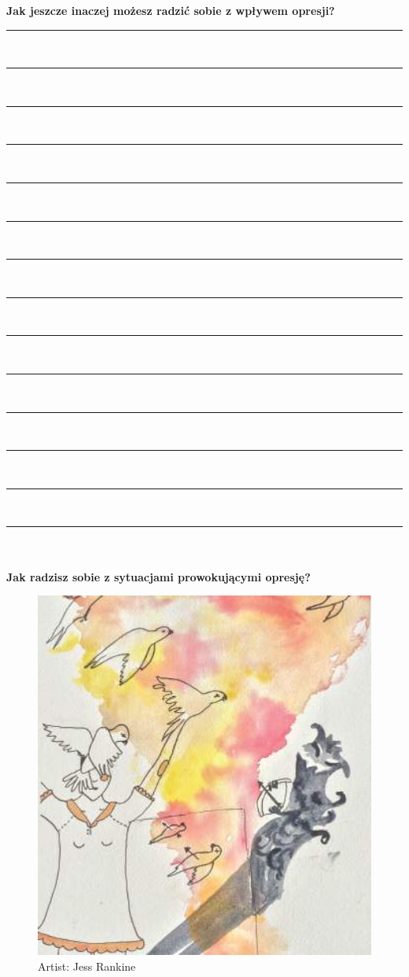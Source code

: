 \noindent\textcolor{ProcessBlue}{\textbf{\Large{Jak jeszcze inaczej możesz radzić sobie z wpływem opresji?}}}\\
\noindent\rule{\textwidth}{1pt}\\
\noindent\rule{\textwidth}{1pt}\\
\noindent\rule{\textwidth}{1pt}\\
\noindent\rule{\textwidth}{1pt}\\
\noindent\rule{\textwidth}{1pt}\\
\noindent\rule{\textwidth}{1pt}\\
\noindent\rule{\textwidth}{1pt}\\
\noindent\rule{\textwidth}{1pt}\\
\noindent\rule{\textwidth}{1pt}\\
\noindent\rule{\textwidth}{1pt}\\
\noindent\rule{\textwidth}{1pt}\\
\noindent\rule{\textwidth}{1pt}\\
\noindent\rule{\textwidth}{1pt}\\
\noindent\rule{\textwidth}{1pt}\\\\

\newpage
\noindent\textcolor{ProcessBlue}{\textbf{\Large{Jak radzisz sobie z sytuacjami prowokującymi opresję?}}}\\
\begin{figure}[h]
\centering
\includegraphics[width=17cm]{TeX_files/3-3.png}
\caption{Artist: Jess Rankine}
\label{3-3}
\end{figure}

